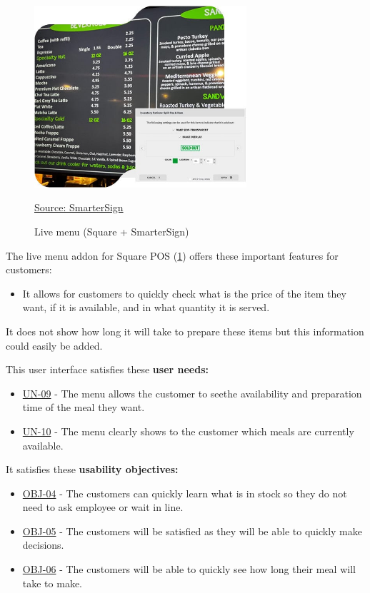 \documentclass[]{VUMIFTemplateClass}
\begin{document}
\begin{figure}[H]
    \centering
    \includegraphics[width=0.7\textwidth]{images/examples/live-menu-square-smartersign.jpg}
    \caption{Live menu (Square + SmarterSign)}
    \href{https://smartersign.com/square}{Source: SmarterSign}
    \label{fig:square-menu}
\end{figure}

The live menu addon for Square POS (\ref{fig:square-menu}) offers these important features for customers:

\begin{itemize}
    \item It allows for customers to quickly check what is the price of the item they want, if it is available, and in what quantity it is served.
\end{itemize}

It does not show how long it will take to prepare these items but this information could easily be added.

This user interface satisfies these \textbf{user needs:}

\begin{itemize}
    \item \hyperref[UN-09]{UN-09} - The menu allows the customer to seethe availability and preparation time of the meal they want.
    \item \hyperref[UN-10]{UN-10} - The menu clearly shows to the customer which meals are currently available.
\end{itemize}

It satisfies these \textbf{usability objectives:}

\begin{itemize}
    \item \hyperref[OBJ-04]{OBJ-04} - The customers can quickly learn what is in stock so they do not need to ask employee or wait in line.
    \item \hyperref[OBJ-05]{OBJ-05} - The customers will be satisfied as they will be able to quickly make decisions.
    \item \hyperref[OBJ-06]{OBJ-06} - The customers will be able to quickly see how long their meal will take to make.
\end{itemize}
\end{document}
